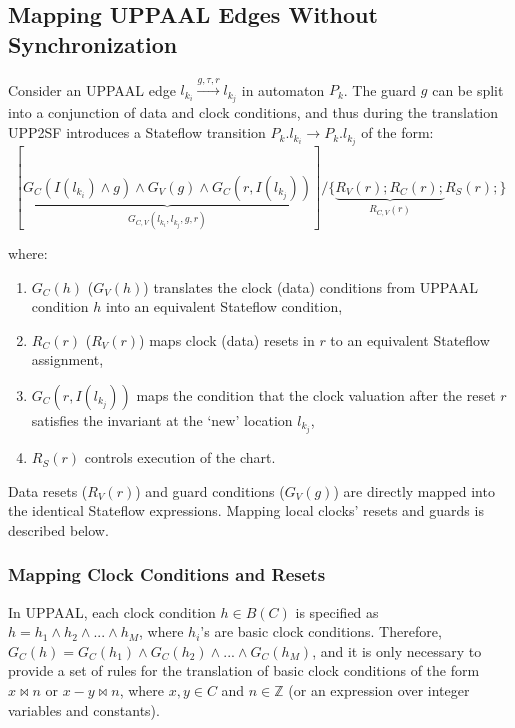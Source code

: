 \subsection{Mapping UPPAAL Edges Without Synchronization}
\label{sec:upp_noSync}


Consider an UPPAAL edge $l_{k_i}\xrightarrow{g,\tau,r} l_{k_j}$ in automaton $P_k$. The guard $g$ can be split into a conjunction of data and clock conditions, and thus during the translation UPP2SF introduces a Stateflow transition $P_k.l_{k_i}\rightarrow P_k.l_{k_j}$ of the form:
\begin{equation}
\label{eqn:trans}
[\underbrace{G_C(I(l_{k_i})\wedge g) \wedge G_V(g) \wedge G_C(r,I(l_{k_j}))}_{G_{C,V}(l_{k_i},l_{k_j},g,r)}] /\{\underbrace{R_V(r); R_C(r);}_{R_{C,V}(r)} R_S(r);\}
\end{equation}

\vspace{-10pt}\noindent
where:

\begin{enumerate}
\item $G_C(h)$ ($G_V(h)$) translates the clock (data) conditions from UPPAAL condition $h$ into an equivalent Stateflow condition,
\item $R_C(r)$ ($R_V(r)$) maps clock (data) resets in $r$ to an equivalent Stateflow assignment,
\item $G_C(r,I(l_{k_j}))$ maps the condition that the clock valuation after the reset $r$ satisfies the invariant at the `new' location $l_{k_j}$,
\item $R_S(r)$ controls execution of the chart.
\end{enumerate}

Data resets ($R_V(r)$) and guard conditions ($G_V(g)$) are directly mapped into the identical Stateflow expressions. Mapping local clocks' resets and guards is described below.

\subsubsection{Mapping Clock Conditions and Resets}

In UPPAAL, each clock condition $h\in B(C)$ is specified as $h=h_1\wedge h_2\wedge...\wedge h_M$, where $h_i$'s are basic clock conditions.  Therefore, $G_C(h)=G_C(h_1)\wedge G_C(h_2)\wedge...\wedge G_C(h_M)$, and it is only necessary to provide a set of rules for the translation of basic clock conditions of the form $x\bowtie n$ or $x-y\bowtie n$, where $x,y\in C$ and $n\in\mathbb{Z}$ (or an expression over integer variables and constants).

